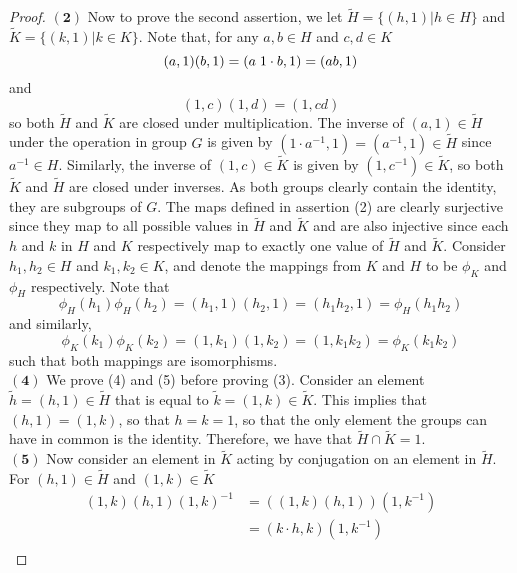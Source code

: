 \documentclass[11pt]{article}
\begin{document}
\begin{proof}
\indent
$\mathbf{(2)}$ Now to prove the second assertion, we let $\tilde{H} = \{ (h,1) | h \in H\}$ and $\tilde{K} = \{ (k,1) | k \in K\}$. Note that, for any $a,b \in H$ and $c,d \in K$
\begin{equation}
(a,1)(b,1) = (a \hspace{0.1 cm} 1 \cdot b, 1) = (ab, 1)
\end{equation}
and 
\begin{equation}
(1,c)(1,d) = (1, cd)
\end{equation}
so both $\tilde{H}$ and $\tilde{K}$ are closed under multiplication. The inverse of $(a,1) \in \tilde{H}$ under the operation in group $G$ is given by $(1 \cdot a^{-1}, 1) = (a^{-1}, 1) \in \tilde{H}$ since $a^{-1} \in H$. Similarly, the inverse of $(1,c) \in \tilde{K}$ is given by $(1, c^{-1}) \in \tilde{K}$, so both $\tilde{K}$ and $\tilde{H}$ are closed under inverses. As both groups clearly contain the identity, they are subgroups of $G$. The maps defined in assertion (2) are clearly surjective since they map to all possible values in $\tilde{H}$ and $\tilde{K}$ and are also injective since each $h$ and $k$ in $H$ and $K$ respectively map to exactly one value of $\tilde{H}$ and $\tilde{K}$. Consider $h_1, h_2 \in H$ and $k_1, k_2 \in K$, and denote the mappings from $K$ and $H$ to be $\phi_K$ and $\phi_H$ respectively. Note that 
\begin{equation}
\phi_H(h_1) \phi_H(h_2) = (h_1, 1)( h_2, 1) = (h_1 h_2, 1) = \phi_H (h_1 h_2)
\end{equation}
and similarly,
\begin{equation}
\phi_K(k_1) \phi_K(k_2) = (1, k_1) (1,k_2) = (1, k_1 k_2) = \phi_K (k_1 k_2)
\end{equation}
such that both mappings are isomorphisms. 
\\
\indent
$\mathbf{(4)}$ We prove (4) and (5) before proving (3). Consider an element $\tilde{h} = (h,1) \in \tilde{H}$ that is equal to $\tilde{k} = (1,k) \in \tilde{K}$. This implies that $(h,1) = (1,k)$, so that $h = k = 1$, so that the only element the groups can have in common is the identity. Therefore, we have that $\tilde{H} \cap \tilde{K} = 1$. \\
\indent
$\mathbf{(5)}$ Now consider an element in $\tilde{K}$ acting by conjugation on an element in $\tilde{H}$. For $(h,1)\in \tilde{H}$ and $(1,k)\in \tilde{K}$ 
\begin{align}
(1,k)(h,1)(1,k)^{-1} &= \left( (1,k) (h,1) \right ) (1,k^{-1})\\
&= (k\cdot h, k ) (1, k^{-1}) \\

\end{align}
\end{proof}
\end{document}
